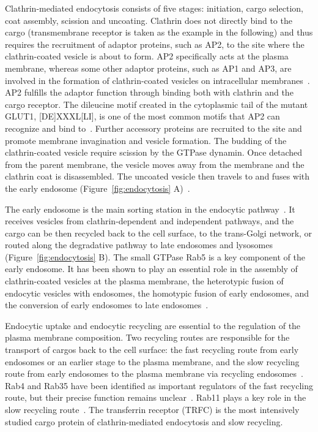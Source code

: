 Clathrin-mediated endocytosis consists of five stages: initiation, cargo selection, coat assembly, scission and uncoating. Clathrin does not directly bind to the cargo (transmembrane receptor is taken as the example in the following) and thus requires the recruitment of adaptor proteins, such as AP2, to the site where the clathrin-coated vesicle is about to form. AP2 specifically acts at the plasma membrane, whereas some other adaptor proteins, such as AP1 and AP3, are involved in the formation of clathrin-coated vesicles on intracellular membranes~\cite{McMahon}. AP2 fulfills the adaptor function through binding both with clathrin and the cargo receptor. The dileucine motif created in the cytoplasmic tail of the mutant GLUT1, [DE]XXXL[LI], is one of the most common motifs that AP2 can recognize and bind to~\cite{Humphries}. Further accessory proteins are recruited to the site and promote membrane invagination and vesicle formation. The budding of the clathrin-coated vesicle require scission by the GTPase dynamin. Once detached from the parent membrane, the vesicle moves away from the membrane and the clathrin coat is disassembled. The uncoated vesicle then travels to and fuses with the early endosome (Figure~\ref{fig:endocytosis} A)~\cite{McMahon}.

The early endosome is the main sorting station in the endocytic pathway~\cite{Huotari}. It receives vesicles from clathrin-dependent and independent pathways, and the cargo can be then recycled back to the cell surface, to the trans-Golgi network, or routed along the degradative pathway to late endosomes and lysosomes (Figure~\ref{fig:endocytosis} B). The small GTPase Rab5 is a key component of the early endosome. It has been shown to play an essential role in the assembly of clathrin-coated vesicles at the plasma membrane, the heterotypic fusion of endocytic vesicles with endosomes, the homotypic fusion of early endosomes, and the conversion of early endosomes to late endosomes~\cite{Stenmark,Huotari}. 

Endocytic uptake and endocytic recycling are essential to the regulation of the plasma membrane composition. Two recycling routes are responsible for the transport of cargos back to the cell surface: the fast recycling route from early endosomes or an earlier stage to the plasma membrane, and the slow recycling route from early endosomes to the plasma membrane via recycling endosomes~\cite{Grant}. Rab4 and Rab35 have been identified as important regulators of the fast recycling route, but their precise function remains unclear~\cite{Grant}. Rab11 plays a key role in the slow recycling route~\cite{Grant}. The transferrin receptor (TRFC) is the most intensively studied cargo protein of clathrin-mediated endocytosis and slow recycling. 

